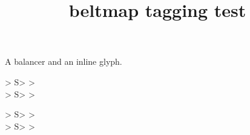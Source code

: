 \documentclass{article}
\title{beltmap tagging test}
\begin{document}
A balancer and an inline  glyph.

\begin{beltgrid}[mix=strict, marks, blueprint]
  > S> > \\
  > S> >
\end{beltgrid}

\begin{beltgrid}[alt={One splitter on two belts.}]
  > S> > \\
  > S> >
\end{beltgrid}
\end{document}
